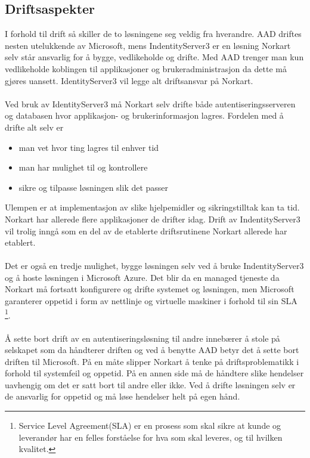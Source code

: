 \subsection{Driftsaspekter}
\label{sec:valgAvLosning_muligeLosninger_driftsaspekter}
I forhold til drift så skiller de to løsningene seg veldig fra hverandre. AAD driftes nesten utelukkende av Microsoft, mens IndentityServer3 er en løsning Norkart selv står ansvarlig for å bygge, vedlikeholde og drifte. Med AAD trenger man kun vedlikeholde koblingen til applikasjoner og brukeradministrasjon da dette må gjøres uansett. IdentityServer3 vil legge alt driftsansvar på Norkart.
\\
\\
Ved bruk av IdentityServer3 må Norkart selv drifte både autentiseringsserveren og databasen hvor applikasjon- og brukerinformasjon lagres. Fordelen med å drifte alt selv er
\begin{itemize}
\item man vet hvor ting lagres til enhver tid
\item man har mulighet til og kontrollere
\item sikre og tilpasse løsningen slik det passer
\end{itemize}
Ulempen er at implementasjon av slike hjelpemidler og sikringstilltak kan ta tid. Norkart har allerede flere applikasjoner de drifter idag. Drift av IndentityServer3 vil trolig inngå som en del av de etablerte driftsrutinene Norkart allerede har etablert. 
\\
\\
Det er også en tredje mulighet, bygge løsningen selv ved å bruke IndentityServer3 og å hoste løsningen i Microsoft Azure. Det blir da en managed tjeneste da Norkart må fortsatt konfigurere og drifte systemet og løsningen, men Microsoft garanterer oppetid i form av nettlinje og virtuelle maskiner i forhold til sin SLA \footnote{Service Level Agreement(SLA) er en prosess som skal sikre at kunde og leverandør har en felles forståelse for hva som skal leveres, og til hvilken kvalitet.\cite{SLA}}.
\\
\\
Å sette bort drift av en autentiseringsløsning til andre innebærer å stole på selskapet som da håndterer driften og ved å benytte AAD betyr det å sette bort driften til Microsoft. På en måte slipper Norkart å tenke på driftsproblematikk i forhold til systemfeil og oppetid. På en annen side må de håndtere slike hendelser uavhengig om det er satt bort til andre eller ikke. Ved å drifte løsningen selv er de ansvarlig for oppetid og må løse hendelser helt på egen hånd.


